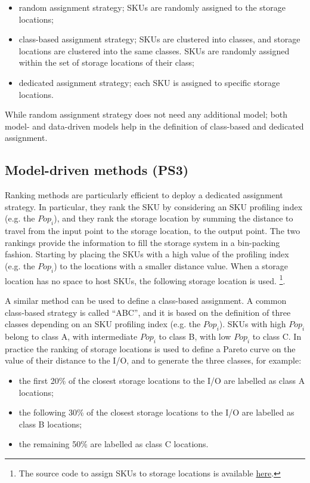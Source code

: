 \begin{itemize}
    \item random assignment strategy; SKUs are randomly assigned to the storage locations;
    \item class-based assignment strategy; SKUs are clustered into classes, and storage locations are clustered into the same classes. SKUs are randomly assigned within the set of storage locations of their class;
    \item dedicated assignment strategy; each SKU is assigned to specific storage locations.

\end{itemize}

While random assignment strategy does not need any additional model; both model- and data-driven models help in the definition of class-based and dedicated assignment.

\subsection{Model-driven methods (PS3)}
Ranking methods are particularly efficient to deploy a dedicated assignment strategy. In particular, they rank the SKU by considering an SKU profiling index (e.g. the $Pop_i$), and they rank the storage location by summing the distance to travel from the input point to the storage location, to the output point. The two rankings provide the information to fill the storage system in a bin-packing fashion. Starting by placing the SKUs with a high value of the profiling index (e.g. the $Pop_i$) to the locations with a smaller distance value. When a storage location has no space to host SKUs, the following storage location is used. \footnote{The source code to assign SKUs to storage locations is available \href{https://github.com/aletuf93/logproj/blob/master/logproj/P2_assignmentProblem/warehousing_ABC_saving.py}{here}.}.\par

A similar method can be used to define a class-based assignment. A common class-based strategy is called “ABC”, and it is based on the definition of three classes depending on an SKU profiling index (e.g. the $Pop_i$). SKUs with high $Pop_i$ belong to class A, with intermediate $Pop_i$ to class B, with low $Pop_i$ to class C. In practice the ranking of storage locations is used to define a Pareto curve on the value of their distance to the I/O, and to generate the three classes, for example:

\begin{itemize}
    \item the first 20\% of the closest storage locations to the I/O are labelled as class A locations;
    \item the following 30\% of the closest storage locations to the I/O are labelled as class B locations;
    \item the remaining 50\% are labelled as class C locations.

\end{itemize}

